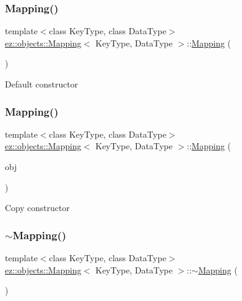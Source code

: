\subsubsection{\texorpdfstring{Mapping()}{Mapping()}\hspace{0.1cm}{\footnotesize\ttfamily [1/2]}}
{\footnotesize\ttfamily template$<$class Key\+Type, class Data\+Type$>$ \\
\hyperlink{classez_1_1objects_1_1Mapping}{ez\+::objects\+::\+Mapping}$<$ Key\+Type, Data\+Type $>$\+::\hyperlink{classez_1_1objects_1_1Mapping}{Mapping} (\begin{DoxyParamCaption}{ }\end{DoxyParamCaption})\hspace{0.3cm}{\ttfamily [inline]}}

Default constructor \mbox{\label{classez_1_1objects_1_1Mapping_a2e01d47b23e082e6aade1923fede999d}} 
\subsubsection{\texorpdfstring{Mapping()}{Mapping()}\hspace{0.1cm}{\footnotesize\ttfamily [2/2]}}
{\footnotesize\ttfamily template$<$class Key\+Type, class Data\+Type$>$ \\
\hyperlink{classez_1_1objects_1_1Mapping}{ez\+::objects\+::\+Mapping}$<$ Key\+Type, Data\+Type $>$\+::\hyperlink{classez_1_1objects_1_1Mapping}{Mapping} (\begin{DoxyParamCaption}\item[{const \hyperlink{classez_1_1objects_1_1Mapping}{Mapping}$<$ Key\+Type, Data\+Type $>$ \&}]{obj }\end{DoxyParamCaption})\hspace{0.3cm}{\ttfamily [inline]}}

Copy constructor \mbox{\label{classez_1_1objects_1_1Mapping_af2a29688f35f5a161744c111f6ec9be0}} 
\subsubsection{\texorpdfstring{$\sim$\+Mapping()}{~Mapping()}}
{\footnotesize\ttfamily template$<$class Key\+Type, class Data\+Type$>$ \\
\hyperlink{classez_1_1objects_1_1Mapping}{ez\+::objects\+::\+Mapping}$<$ Key\+Type, Data\+Type $>$\+::$\sim$\hyperlink{classez_1_1objects_1_1Mapping}{Mapping} (\begin{DoxyParamCaption}{ }\end{DoxyParamCaption})\hspace{0.3cm}{\ttfamily [inline]}}

